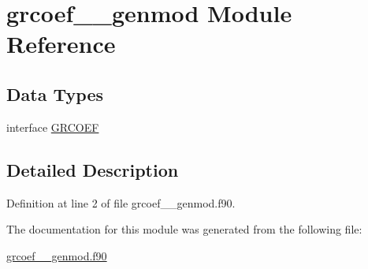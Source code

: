 \hypertarget{classgrcoef____genmod}{\section{grcoef\+\_\+\+\_\+genmod Module Reference}
\label{classgrcoef____genmod}
}
\subsection*{Data Types}
\begin{DoxyCompactItemize}
\item 
interface \hyperlink{interfacegrcoef____genmod_1_1GRCOEF}{G\+R\+C\+O\+E\+F}
\end{DoxyCompactItemize}


\subsection{Detailed Description}


Definition at line 2 of file grcoef\+\_\+\+\_\+genmod.\+f90.



The documentation for this module was generated from the following file\+:\begin{DoxyCompactItemize}
\item 
\hyperlink{grcoef____genmod_8f90}{grcoef\+\_\+\+\_\+genmod.\+f90}\end{DoxyCompactItemize}
